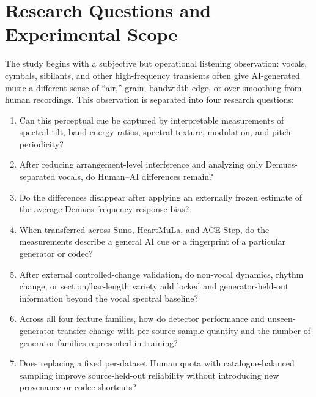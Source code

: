 \documentclass[11pt,a4paper]{article}
\begin{document}
\noindent{}

\tableofcontents
\listoffigures
\listoftables
\clearpage

\section{Research Questions and Experimental Scope}
\label{sec:scope}

The study begins with a subjective but operational listening observation: vocals, cymbals, sibilants, and other high-frequency transients often give AI-generated music a different sense of ``air,'' grain, bandwidth edge, or over-smoothing from human recordings. This observation is separated into four research questions:

\begin{enumerate}
  \item Can this perceptual cue be captured by interpretable measurements of spectral tilt, band-energy ratios, spectral texture, modulation, and pitch periodicity?
  \item After reducing arrangement-level interference and analyzing only Demucs-separated vocals, do Human--AI differences remain?
  \item Do the differences disappear after applying an externally frozen estimate of the average Demucs frequency-response bias?
  \item When transferred across Suno, HeartMuLa, and ACE-Step, do the measurements describe a general AI cue or a fingerprint of a particular generator or codec?
  \item After external controlled-change validation, do non-vocal dynamics, rhythm change, or section/bar-length variety add locked and generator-held-out information beyond the vocal spectral baseline?
  \item Across all four feature families, how do detector performance and unseen-generator transfer change with per-source sample quantity and the number of generator families represented in training?
  \item Does replacing a fixed per-dataset Human quota with catalogue-balanced sampling improve source-held-out reliability without introducing new provenance or codec shortcuts?
\end{enumerate}
\end{document}
